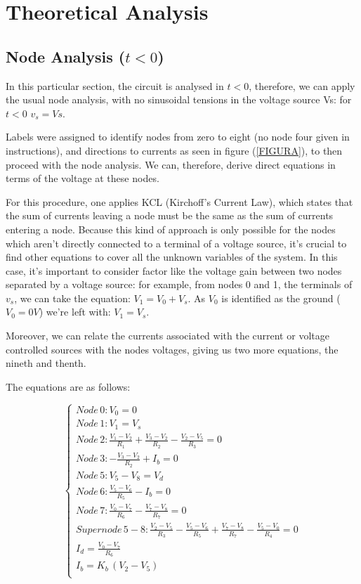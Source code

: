 \section{Theoretical Analysis}
\label{sec:analysis}



\subsection{Node Analysis ($t<0$)}

In this particular section, the circuit is analysed in $t<0$, therefore, we can apply the usual node analysis, with no sinusoidal tensions in the voltage source Vs: for $t<0$ $v_s = Vs$.

Labels were assigned to identify nodes from zero to eight (no node four given in instructions), and directions to currents as seen in figure (\ref{FIGURA}), to then proceed with the node analysis.  We can, therefore, derive direct equations in terms of the voltage at these nodes.

For this procedure, one applies KCL (Kirchoff's Current Law), which states that the sum of currents leaving a node must be the same as the sum of currents entering a node. Because this kind of approach is only possible for the nodes which aren't directly connected to a terminal of a voltage source, it's crucial to find other equations to cover all the unknown variables of the system. In this case, it's important to consider factor like the voltage gain between two nodes separated by a voltage source: for example, from nodes 0 and 1, the terminals of $v_s$, we can take the equation: $V_1 = V_0 + V_s$. As $V_0$ is identified as the ground ($V_0 = 0V$) we're left with: $V_1 = V_s$.

Moreover, we can relate the currents associated with the current or voltage controlled sources with the nodes voltages, giving us two more equations, the nineth and thenth.

The equations are as follows:

\begin{equation} 
\begin{cases}

    Node\, 0: V_0 = 0 \\
    Node\, 1: V_1 = V_s \\
    Node\, 2: \frac{V_1 - V_2}{R_1} + \frac{V_3 - V_2}{R_2} - \frac{V_2 - V_5}{R_3} = 0 \\
    Node\, 3: -\frac{V_3 - V_2}{R_2} + I_b = 0 \\
    Node\, 5: V_5 - V_8 = V_d \\
    Node\, 6: \frac{V_5 - V_6}{R_5} - I_b = 0 \\
    Node\, 7: \frac{V_0 - V_7}{R_6} - \frac{V_7 - V_8}{R_7} = 0 \\
    Supernode\, 5-8: \frac{V_2 - V_5}{R_3} - \frac{V_5 - V_6}{R_5} + \frac{V_7 - V_8}{R_7} - \frac{V_5 - V_0}{R_4} = 0 \\
    I_d = \frac{V_0 - V_7}{R_6} \\
    I_b = K_b\,(V_2 - V_5) \\
    
\end{cases}
\label{eq:1}
\end{equation}



